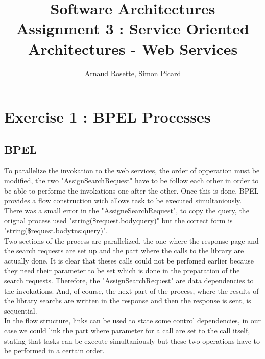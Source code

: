 \documentclass[a4paper,10pt]{article}
\title{Software Architectures\\ Assignment 3 : Service Oriented Architectures - Web Services}
\author{Arnaud Rosette, Simon Picard}
\begin{document}
\maketitle
\section{Exercise 1 : BPEL Processes}
\subsection{BPEL}
To parallelize the invokation to the web services, the order of opperation must be modified, the two "AssignSearchRequest" have to be follow each other in order to be able to performe the invokations one after the other. Once this is done, BPEL provides a flow construction wich allows task to be executed simultaniously. There was a small error in the "AssigneSearchRequest", to copy the query, the orignal process used "string(\$request.body\/\/query)" but the correct form is "string(\$request.body\/\/tns:query)".\\

Two sections of the process are parallelized, the one where the response page and the search requests are set up and the part where the calls to the library are actually done. It is clear that theses calls could not be perfomed earlier because they need their parameter to be set which is done in the preparation of the search requests. Therefore, the "AssignSearchRequest" are data dependencies to the invokations. And, of course, the next part of the process, where the results of the library searchs are written in the response and then the response is sent, is sequential.\\

In the flow structure, links can be used to state some control dependencies, in our case we could link the part where parameter for a call are set to the call itself, stating that tasks can be execute simultaniously but these two operations have to be performed in a certain order.
\end{document}
